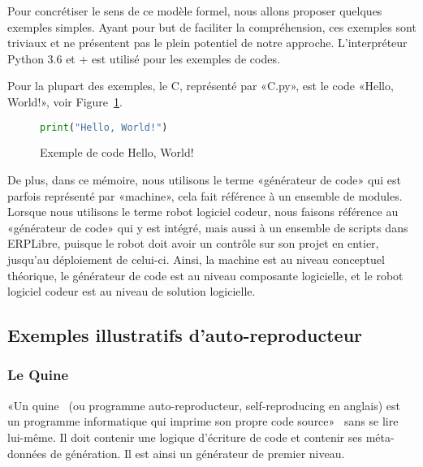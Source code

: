 Pour concrétiser le sens de ce modèle formel, nous allons proposer quelques exemples simples. Ayant pour but de faciliter la compréhension, ces exemples sont triviaux et ne présentent pas le plein potentiel de notre approche. L’interpréteur Python 3.6 et + est utilisé pour les exemples de codes.

Pour la plupart des exemples, le C, représenté par «C.py», est le code «Hello, World!», voir Figure~\ref{fig:exemple_code_hello_world}.

\begin{figure}
\begin{lstlisting}[language=Python]
print("Hello, World!")
\end{lstlisting}
\caption{Exemple de code Hello, World!}
\label{fig:exemple_code_hello_world}
\end{figure}

De plus, dans ce mémoire, nous utilisons le terme «générateur de code» qui est parfois représenté par «machine», cela fait référence à un ensemble de modules. Lorsque nous utilisons le terme robot logiciel codeur, nous faisons référence au «générateur de code» qui y est intégré, mais aussi à un ensemble de scripts dans ERPLibre, puisque le robot doit avoir un contrôle sur son projet en entier, jusqu'au déploiement de celui-ci. Ainsi, la machine est au niveau conceptuel théorique, le générateur de code est au niveau composante logicielle, et le robot logiciel codeur est au niveau de solution logicielle.

\subsection{Exemples illustratifs d’auto-reproducteur}\label{exemple_illustratif_auto_reproducteur}

\subsubsection{Le Quine}

«Un quine~\cite{sarkar2020quines} (ou programme auto-reproducteur, self-reproducing en anglais) est un programme informatique qui imprime son propre code source»~\cite{wiki_quine} sans se lire lui-même. Il doit contenir une logique d’écriture de code et contenir ses méta-données de génération. Il est ainsi un générateur de premier niveau.


